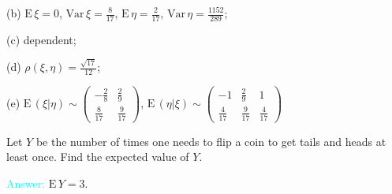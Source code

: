 \documentclass[14pt]{exam}
\def\Var{{\textrm{Var}}\,}
\def\E{{\textrm{E}}\,}
\begin{document}
\begin{questions}
			(b) $\E\xi = 0$, $\Var\xi = \frac{8}{17}$, $\E\eta = \frac{2}{17}$, $\Var\eta = \frac{1152}{289}$;
			
			(c) dependent;
			
			(d) $\rho(\xi, \eta) = \frac{\sqrt{17}}{12}$;
			
			(e) $\E(\xi|\eta) \sim \begin{pmatrix}
				-\frac{2}{8} & \frac{2}{9}\\
				\frac{8}{17} & \frac{9}{17}
			\end{pmatrix}$, $\E(\eta|\xi) \sim \begin{pmatrix}
				-1 & \frac{2}{9} & 1\\
				\frac{4}{17} & \frac{9}{17} & \frac{4}{17}
			\end{pmatrix}$
			
			\question
			Let $Y$ be the number of times one needs to flip a coin to get tails and heads at least once. Find the expected value of $Y$.
			
			\textcolor{cyan}{Answer:} $\E Y = 3$.
			
			
 	\end{questions}
\end{document}
